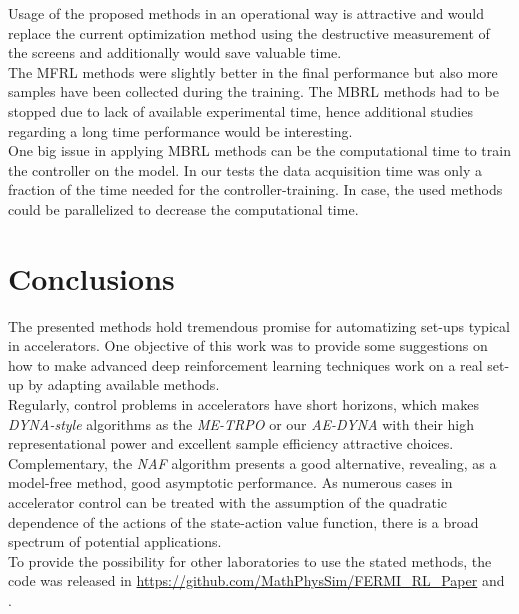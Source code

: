 \documentclass[
reprint,
amsmath,amssymb,amsfonts,clevref,
aps,
prstab,
]{revtex4-2}
\begin{document}
	Usage of the proposed methods in an operational way is attractive and would replace the current optimization method using the destructive measurement of the screens and additionally would save valuable time.\\ 
	The MFRL methods were slightly better in the final performance but also more samples have been collected during the training. The MBRL methods had to be stopped due to lack of available experimental time, hence additional studies regarding a long time performance would be interesting.\\ One big issue in applying MBRL methods can be the computational time to train the controller on the model. In our tests the data acquisition time was only a fraction of the time needed for the controller-training. In case, the used methods could be parallelized to decrease the computational time.
	
\section{Conclusions}
 The presented methods hold tremendous promise for automatizing set-ups typical in accelerators. One objective of this work was to provide some suggestions on how to make advanced deep reinforcement learning techniques work on a real set-up by adapting available methods.\\
Regularly, control problems in accelerators have short horizons, which makes \emph{DYNA-style} algorithms as the \emph{ME-TRPO} or our \emph{AE-DYNA} with their high representational power and excellent sample efficiency attractive choices.\\
Complementary, the \emph{NAF} algorithm presents a good alternative, revealing, as a model-free method, good asymptotic performance. As numerous cases in accelerator control can be treated with the assumption of the quadratic dependence of the actions of the state-action value function, there is a broad spectrum of potential applications.\\
 
 To provide the possibility for other laboratories to use the stated methods, the code was released in \url{https://github.com/MathPhysSim/FERMI_RL_Paper} and \cite{Hirlaender2020b}.
 \vfill
 \newpage
 \vfill
 
 
 
 
 
  \newpage
	\appendix
\end{document}
